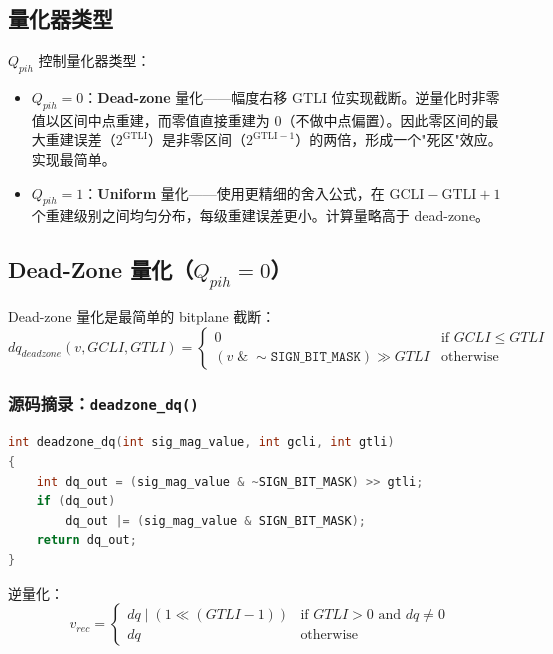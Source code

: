 \subsection{量化器类型}

$Q_{pih}$ 控制量化器类型：
\begin{itemize}
  \item $Q_{pih} = 0$：\textbf{Dead-zone} 量化——幅度右移 $\mathrm{GTLI}$ 位实现截断。逆量化时非零值以区间中点重建，而零值直接重建为 0（不做中点偏置）。因此零区间的最大重建误差（$2^{\mathrm{GTLI}}$）是非零区间（$2^{\mathrm{GTLI}-1}$）的两倍，形成一个"死区"效应。实现最简单。
  \item $Q_{pih} = 1$：\textbf{Uniform} 量化——使用更精细的舍入公式，在 $\mathrm{GCLI}-\mathrm{GTLI}+1$ 个重建级别之间均匀分布，每级重建误差更小。计算量略高于 dead-zone。
\end{itemize}

\subsection{Dead-Zone 量化（$Q_{pih} = 0$）}

Dead-zone 量化是最简单的 bitplane 截断：
\begin{equation}
\mathit{dq}_{\mathit{deadzone}}(v, \mathit{GCLI}, \mathit{GTLI}) =
\begin{cases}
0 & \text{if } \mathit{GCLI} \leq \mathit{GTLI} \\
(v \;\&\; \sim\texttt{SIGN\_BIT\_MASK}) \gg \mathit{GTLI} & \text{otherwise}
\end{cases}
\end{equation}

\subsubsection{源码摘录：\texttt{deadzone\_dq()}}

\begin{lstlisting}[language=C,numbers=none]
int deadzone_dq(int sig_mag_value, int gcli, int gtli)
{
    int dq_out = (sig_mag_value & ~SIGN_BIT_MASK) >> gtli;
    if (dq_out)
        dq_out |= (sig_mag_value & SIGN_BIT_MASK);
    return dq_out;
}
\end{lstlisting}

逆量化：
\begin{equation}
v_{\mathit{rec}} = \begin{cases}
\mathit{dq} \;|\; (1 \ll (\mathit{GTLI} - 1)) & \text{if } \mathit{GTLI} > 0 \text{ and } \mathit{dq} \neq 0 \\
\mathit{dq} & \text{otherwise}
\end{cases}
\end{equation}

